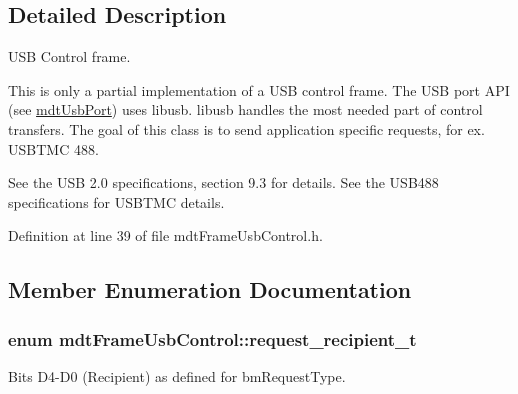 \subsection{Detailed Description}
USB Control frame. 

This is only a partial implementation of a USB control frame. The USB port API (see \hyperlink{classmdt_usb_port}{mdtUsbPort}) uses libusb. libusb handles the most needed part of control transfers. The goal of this class is to send application specific requests, for ex. USBTMC 488.

See the USB 2.0 specifications, section 9.3 for details. See the USB488 specifications for USBTMC details. 

Definition at line 39 of file mdtFrameUsbControl.h.



\subsection{Member Enumeration Documentation}
\hypertarget{classmdt_frame_usb_control_aaf1f08b1b5e47ab18426800ed0accbde}{
\subsubsection[{request\_\-recipient\_\-t}]{\setlength{\rightskip}{0pt plus 5cm}enum {\bf mdtFrameUsbControl::request\_\-recipient\_\-t}}}
\label{classmdt_frame_usb_control_aaf1f08b1b5e47ab18426800ed0accbde}


Bits D4-\/D0 (Recipient) as defined for bmRequestType. 

